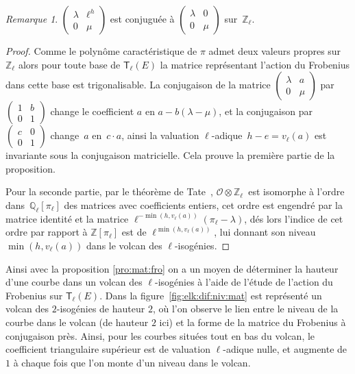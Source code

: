 \documentclass[10pt,a4paper]{book}
\theoremstyle{plain}
\theoremstyle{definition}
\theoremstyle{definition}
\theoremstyle{definition}
\theoremstyle{definition}
\theoremstyle{definition}
\theoremstyle{remark}
\newtheorem{rem}[thm]{Remarque}
\theoremstyle{remark}
\theoremstyle{definition}
\begin{document}
\begin{rem}
$\left(\begin{smallmatrix} \lambda & \ell^h \\ 0 &
\mu \end{smallmatrix}\right)$ est conjuguée à $\left(\begin{smallmatrix} \lambda & 0 \\ 0 & \mu\end{smallmatrix}\right)$ sur~$\mathbb{Z}_{\ell}$.
\end{rem}

\begin{proof}
Comme le polynôme caractéristique de $\pi$ admet deux valeurs propres sur 
$\mathbb{Z}_{\ell}$ alors pour toute base de $\mathsf{T}_{\ell}(E)$ la matrice
représentant l'action du Frobenius dans cette base est trigonalisable. %
La conjugaison de la matrice $\left ( \begin{smallmatrix}\lambda & a\\0 & \mu
\end{smallmatrix}\right )$ par~$\left ( \begin{smallmatrix}1 & b\\0 & 1
\end{smallmatrix} \right )$ change le coefficient $a$ en $a-b (\lambda - \mu)$, 
et la conjugaison par ~$\left(\begin{smallmatrix} c & 0 \\ 0 &
1\end{smallmatrix}\right)$ change~$a$ en~$c \cdot a$,
ainsi la valuation $\ell$-adique~$h-e = v_{\ell}(a)$ est invariante sous la 
conjugaison matricielle. Cela prouve la première partie de la proposition. 

Pour la seconde partie, par le théorème de 
Tate~\cite[Isogeny theorem III.7.7 (a)]{Silv1}, $\mathcal{O} \otimes 
 \mathbb{Z}_{\ell}$~est isomorphe à l'ordre dans~$\mathbb{Q}_{\ell}[\pi_{\ell}]$
des matrices avec coefficients entiers, cet ordre est engendré par la matrice 
 identité et la matrice $\ell^{-\min (h, v_\ell(a))} (\pi_{\ell}-\lambda)$, dés 
 lors l'indice de cet ordre par rapport à $\mathbb{Z}[\pi_{\ell}]$ est de 
$\ell^{\min (h, v_\ell(a))}$, lui donnant son niveau $\min (h, v_\ell(a))$ dans 
 le volcan des $\ell$-isogénies.
\end{proof}

Ainsi avec la proposition \ref{pro:mat:fro} on a un moyen de déterminer la 
hauteur d'une courbe dans un volcan des $\ell$-isogénies à l'aide de l'étude de 
l'action du Frobenius sur $\mathsf{T}_{\ell}(E)$. Dans la 
figure~\ref{fig:elk:dif:niv:mat} est représenté un volcan des $2$-isogénies 
de hauteur $2$, où l'on observe le lien entre le niveau de la courbe dans le 
volcan (de hauteur $2$ ici) et la forme de la matrice du Frobenius à conjugaison 
près. Ainsi, pour les courbes situées tout en bas du volcan, le coefficient 
triangulaire supérieur est de valuation $\ell$-adique nulle, et augmente
de $1$ à chaque fois que l'on monte d'un niveau dans le volcan.
\end{document}
